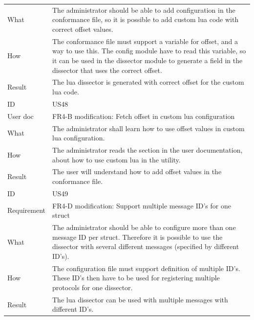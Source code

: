 \begin{table}[htbp]
{\begin{tabularx}{1.2\textwidth}{l X}
	What & The administrator should be able to add configuration in the conformance file, so it is possible to add custom \Gls{lua} code with correct offset values.  \\
	How & The conformance file must support a variable for offset, and a way to use this. The config module have to read this variable, so it can be used in the \gls{dissector} module to generate a field in the \gls{dissector} that uses the correct offset. \\
	Result & The \Gls{lua} \gls{dissector} is generated with correct offset for the custom \Gls{lua} code. \\	
	\midrule
	ID & US48 \\
	User doc & FR4-B modification: Fetch offset in custom \Gls{lua} configuration  \\
	What & The administrator shall learn how to use offset values in custom \Gls{lua} configuration.   \\
	How & The administrator reads the section in the user documentation, about how to use custom \Gls{lua} in the \gls{utility}.  \\
	Result & The user will understand how to add offset values in the conformance file. \\
	\midrule
	ID & US49 \\
	Requirement & FR4-D modification: Support multiple message ID's for one \gls{struct} \\
	What & The administrator should be able to configure more than one message ID per \gls{struct}. Therefore it is possible to use the \gls{dissector} with several different messages (specified by different ID’s).    \\
	How & The configuration file must support definition of multiple ID’s. These ID’s then have to be used for registering multiple \glspl{protocol} for one \gls{dissector}.  \\
	Result & The \Gls{lua} \gls{dissector} can be used with multiple messages with different ID’s. \\
	\bottomrule
\end{tabularx}}
\end{table}

